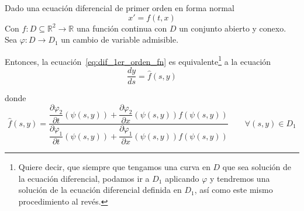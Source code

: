 \begin{teo}
    Dado una ecuación diferencial de primer orden en forma normal
    \begin{equation}\label{eq:dif_1er_orden_fn}
        x'=f(t,x)
    \end{equation}
    Con $f:D\subseteq \mathbb{R}^2\rightarrow\mathbb{R}$ una función continua con $D$ un conjunto abierto y conexo. Sea $\varphi:D\rightarrow D_1$ un cambio de variable admisible.

    Entonces, la ecuación~\ref{eq:dif_1er_orden_fn} es equivalente\footnote{Quiere decir, que siempre que tengamos una curva en $D$ que sea solución de la ecuación diferencial, podamos ir a $D_1$ aplicando $\varphi$ y tendremos una solución de la ecuación diferencial definida en $D_1$, así como este mismo procedimiento al revés.} a la ecuación
    \begin{equation}\label{eq:dif_1er_orden_fn_cambiada}
        \dfrac{dy}{ds} = \hat{f}(s,y)
    \end{equation}

    donde
    \begin{equation*}
        \hat{f}(s,y) = \dfrac{\dfrac{\partial\varphi_2}{\partial t}(\psi(s,y))+\dfrac{\partial\varphi_2}{\partial x}(\psi(s,y))f(\psi(s,y))}{\dfrac{\partial\varphi_1}{\partial t}(\psi(s,y)) + \dfrac{\partial\varphi_1}{\partial x}(\psi(s,y))f(\psi(s,y))} \qquad \forall (s,y)\in D_1
    \end{equation*}


\end{teo}
